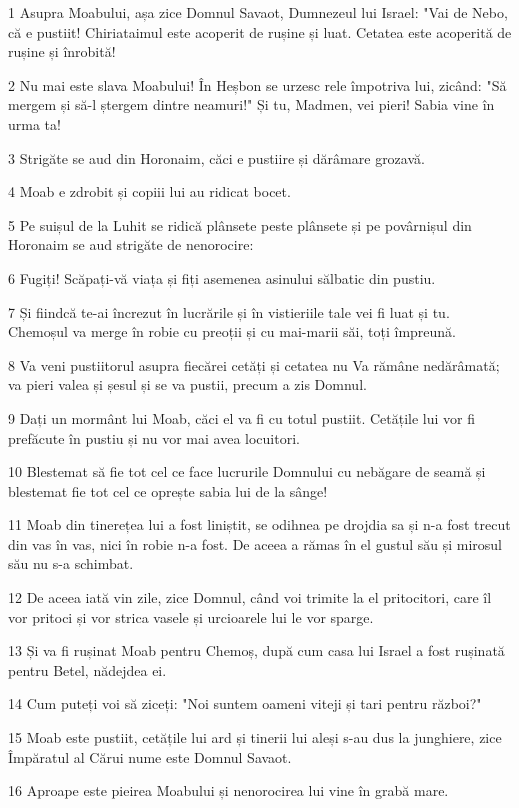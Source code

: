\par 1 Asupra Moabului, așa zice Domnul Savaot, Dumnezeul lui Israel: "Vai de Nebo, că e pustiit! Chiriataimul este acoperit de rușine și luat. Cetatea este acoperită de rușine și înrobită!
\par 2 Nu mai este slava Moabului! În Heșbon se urzesc rele împotriva lui, zicând: "Să mergem și să-l ștergem dintre neamuri!" Și tu, Madmen, vei pieri! Sabia vine în urma ta!
\par 3 Strigăte se aud din Horonaim, căci e pustiire și dărâmare grozavă.
\par 4 Moab e zdrobit și copiii lui au ridicat bocet.
\par 5 Pe suișul de la Luhit se ridică plânsete peste plânsete și pe povârnișul din Horonaim se aud strigăte de nenorocire:
\par 6 Fugiți! Scăpați-vă viața și fiți asemenea asinului sălbatic din pustiu.
\par 7 Și fiindcă te-ai încrezut în lucrările și în vistieriile tale vei fi luat și tu. Chemoșul va merge în robie cu preoții și cu mai-marii săi, toți împreună.
\par 8 Va veni pustiitorul asupra fiecărei cetăți și cetatea nu Va rămâne nedărâmată; va pieri valea și șesul și se va pustii, precum a zis Domnul.
\par 9 Dați un mormânt lui Moab, căci el va fi cu totul pustiit. Cetățile lui vor fi prefăcute în pustiu și nu vor mai avea locuitori.
\par 10 Blestemat să fie tot cel ce face lucrurile Domnului cu nebăgare de seamă și blestemat fie tot cel ce oprește sabia lui de la sânge!
\par 11 Moab din tinerețea lui a fost liniștit, se odihnea pe drojdia sa și n-a fost trecut din vas în vas, nici în robie n-a fost. De aceea a rămas în el gustul său și mirosul său nu s-a schimbat.
\par 12 De aceea iată vin zile, zice Domnul, când voi trimite la el pritocitori, care îl vor pritoci și vor strica vasele și urcioarele lui le vor sparge.
\par 13 Și va fi rușinat Moab pentru Chemoș, după cum casa lui Israel a fost rușinată pentru Betel, nădejdea ei.
\par 14 Cum puteți voi să ziceți: "Noi suntem oameni viteji și tari pentru război?"
\par 15 Moab este pustiit, cetățile lui ard și tinerii lui aleși s-au dus la junghiere, zice Împăratul al Cărui nume este Domnul Savaot.
\par 16 Aproape este pieirea Moabului și nenorocirea lui vine în grabă mare.
